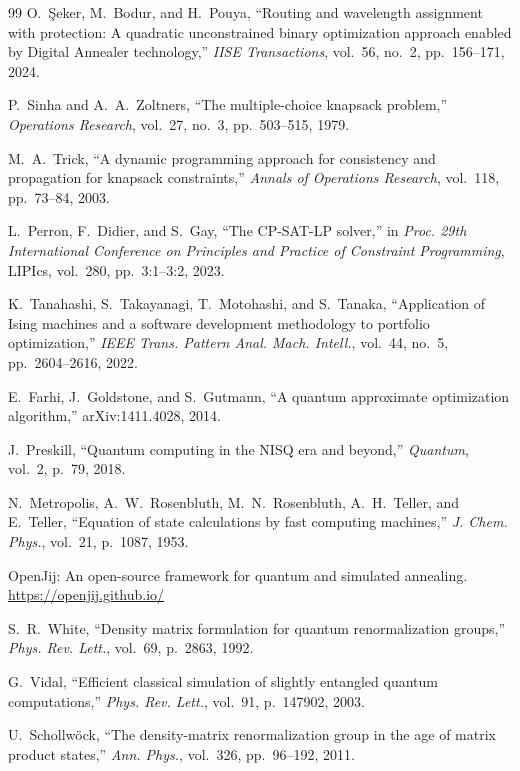 \documentclass[twocolumn]{article}
\begin{document}
\begin{thebibliography}{99}
O.~\c{S}eker, M.~Bodur, and H.~Pouya,
``Routing and wavelength assignment with protection: A quadratic
unconstrained binary optimization approach enabled by Digital
Annealer technology,''
\emph{IISE Transactions}, vol.~56, no.~2, pp.~156--171, 2024.

P.~Sinha and A.~A.~Zoltners,
``The multiple-choice knapsack problem,''
\emph{Operations Research}, vol.~27, no.~3, pp.~503--515, 1979.

M.~A.~Trick,
``A dynamic programming approach for consistency and propagation for
knapsack constraints,''
\emph{Annals of Operations Research}, vol.~118, pp.~73--84, 2003.

L.~Perron, F.~Didier, and S.~Gay,
``The CP-SAT-LP solver,''
in \emph{Proc. 29th International Conference on Principles and Practice
of Constraint Programming}, LIPIcs, vol.~280, pp.~3:1--3:2, 2023.

K.~Tanahashi, S.~Takayanagi, T.~Motohashi, and S.~Tanaka,
``Application of Ising machines and a software development methodology
to portfolio optimization,''
\emph{IEEE Trans. Pattern Anal. Mach. Intell.}, vol.~44, no.~5,
pp.~2604--2616, 2022.

E.~Farhi, J.~Goldstone, and S.~Gutmann,
``A quantum approximate optimization algorithm,''
arXiv:1411.4028, 2014.

J.~Preskill, ``Quantum computing in the NISQ era and beyond,''
\emph{Quantum}, vol.~2, p.~79, 2018.

N.~Metropolis, A.~W.~Rosenbluth, M.~N.~Rosenbluth, A.~H.~Teller,
and E.~Teller,
``Equation of state calculations by fast computing machines,''
\emph{J. Chem. Phys.}, vol.~21, p.~1087, 1953.

OpenJij: An open-source framework for quantum and simulated annealing.
\url{https://openjij.github.io/}

S.~R.~White, ``Density matrix formulation for quantum renormalization
groups,''
\emph{Phys. Rev. Lett.}, vol.~69, p.~2863, 1992.

G.~Vidal, ``Efficient classical simulation of slightly entangled
quantum computations,''
\emph{Phys. Rev. Lett.}, vol.~91, p.~147902, 2003.

U.~Schollw\"ock, ``The density-matrix renormalization group in the
age of matrix product states,''
\emph{Ann. Phys.}, vol.~326, pp.~96--192, 2011.


\end{thebibliography}
\end{document}
